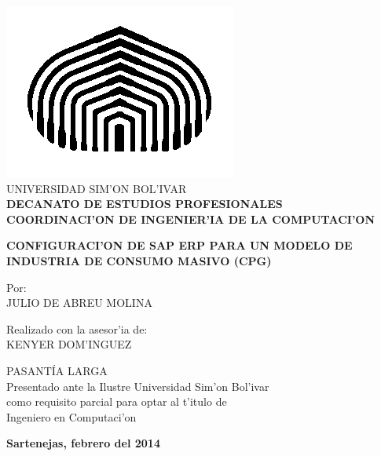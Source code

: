 \begin{titlepage}
\begin{center}

\includegraphics[scale=0.5,type=png,ext=.png,read=.png]{figures/cebolla} \\

\textsc {\large UNIVERSIDAD SIM'ON BOL'IVAR} \\
\textsc{\bfseries DECANATO DE ESTUDIOS PROFESIONALES\\
COORDINACI'ON DE INGENIER'IA DE LA COMPUTACI'ON}

\bigskip
\bigskip
\bigskip
\bigskip
\bigskip
\bigskip
\bigskip
\bigskip
\bigskip

\textsc{\bfseries CONFIGURACI'ON DE SAP ERP PARA UN MODELO DE INDUSTRIA DE CONSUMO MASIVO (CPG)}

\bigskip
\bigskip
\bigskip
\bigskip
\bigskip

\begin{minipage}{\textwidth}
\centering
Por: \\
JULIO DE ABREU MOLINA \\

\bigskip
\bigskip
\bigskip

Realizado con la asesor'ia de: \\
KENYER DOM'INGUEZ
\end{minipage}

\bigskip
\bigskip
\bigskip
\bigskip
\bigskip
\bigskip
\bigskip
\bigskip
\bigskip

{PASANT\'IA LARGA \\ Presentado ante la Ilustre Universidad Sim'on Bol'ivar \\
como requisito parcial para optar al t'itulo de \\ Ingeniero en Computaci'on} \\

\bigskip
\bigskip
\vfill

{\large \bfseries Sartenejas, febrero del 2014}

\end{center}
\end{titlepage}
